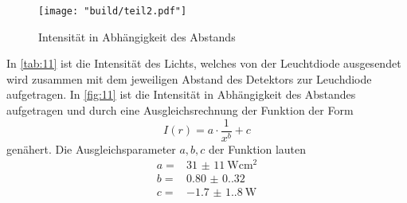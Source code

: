 \begin{figure}[H]
    \caption{Intensität in Abhängigkeit des Abstands}
    \label{fig:11}
    \centering
    \texttt{[image: "build/teil2.pdf"]}
\end{figure}
In \autoref{tab:11} ist die Intensität des Lichts, welches von der Leuchtdiode
ausgesendet wird zusammen mit dem jeweiligen Abstand des Detektors zur
Leuchdiode aufgetragen. In \autoref{fig:11} ist die Intensität in Abhängigkeit
des Abstandes aufgetragen und durch eine Ausgleichsrechnung der Funktion der
Form 
\begin{equation}
    I \left(r\right) = a \cdot \frac{1}{x^b} + c
\end{equation}
genähert.
Die Ausgleichsparameter $a, b, c$ der Funktion lauten
\begin{align*}
    a = & \qty{31(11)}{\watt\centi\meter\squared}   \\
    b = & \qty{0.80(0.32)}{}     \\
    c = & \qty{-1.7(1.8)}{\watt}       
\end{align*}

\label{sec:Auswertung}
